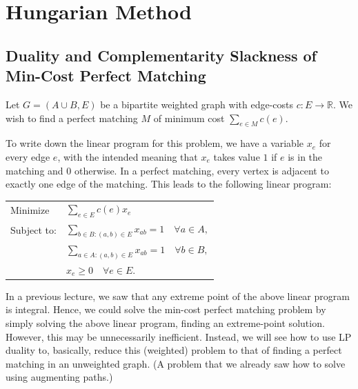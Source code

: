 % 
\section{Hungarian Method}
\subsection{Duality and Complementarity Slackness of Min-Cost Perfect Matching}

Let $G=(A\cup B,E)$ be a bipartite weighted graph with edge-costs $c:E\to\mathbb{R}$. We wish to
find a perfect matching $M$ of minimum cost $\sum_{e\in M}c(e)$.

To write down the linear program for this problem, we have a variable $x_e$ for every edge $e$,
with the intended meaning that $x_e$ takes value $1$ if $e$ is in the matching and $0$ otherwise.
In a perfect matching, every vertex is adjacent to exactly one edge of the matching. This leads to
the following linear program:
\begin{center}
\begin{tabular}{ll}
  Minimize    & $\displaystyle\sum_{e\in E}c(e)x_e$\\[8pt]
  Subject to: & $\displaystyle\sum_{b\in B:(a,b)\in E}x_{ab}=1\quad\forall a\in A,$\\[8pt]
              & $\displaystyle\sum_{a\in A:(a,b)\in E}x_{ab}=1\quad\forall b\in B,$\\[8pt]
              & $x_e\ge 0\quad\forall e\in E.$
\end{tabular}
\end{center}
In a previous lecture, we saw that any extreme point of the above linear program is integral.
Hence, we could solve the min-cost perfect matching problem by simply solving the above linear
program, finding an extreme-point solution. However, this may be unnecessarily inefficient.
Instead, we will see how to use LP duality to, basically, reduce this (weighted) problem to that
of finding a perfect matching in an unweighted graph. (A problem that we already saw how to solve
using augmenting paths.)

